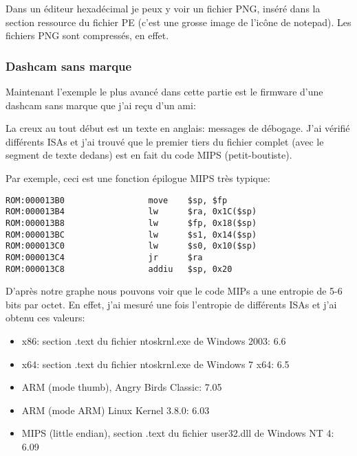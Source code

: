 

Dans un éditeur hexadécimal je peux y voir un fichier PNG, inséré dans la section
ressource du fichier PE (c'est une grosse image de l'icône de notepad).
Les fichiers PNG sont compressés, en effet.

\subsubsection{Dashcam sans marque}

Maintenant l'exemple le plus avancé dans cette partie est le firmware d'une dashcam
sans marque que j'ai reçu d'un ami:



La creux au tout début est un texte en anglais: messages de débogage.
J'ai vérifié différents \ac{ISA}s et j'ai trouvé que le premier tiers du fichier
complet (avec le segment de texte dedans) est en fait du code MIPS (petit-boutiste).

Par exemple, ceci est une fonction épilogue MIPS très typique:

\begin{lstlisting}[style=customasmMIPS]
ROM:000013B0                 move    $sp, $fp
ROM:000013B4                 lw      $ra, 0x1C($sp)
ROM:000013B8                 lw      $fp, 0x18($sp)
ROM:000013BC                 lw      $s1, 0x14($sp)
ROM:000013C0                 lw      $s0, 0x10($sp)
ROM:000013C4                 jr      $ra
ROM:000013C8                 addiu   $sp, 0x20
\end{lstlisting}

D'après notre graphe nous pouvons voir que le code MIPs a une entropie de 5-6 bits
par octet.
En effet, j'ai mesuré une fois l'entropie de différents \ac{ISA}s et j'ai obtenu
ces valeurs:

\begin{itemize}
\item x86: section .text du fichier ntoskrnl.exe de Windows 2003: 6.6
\item x64: section .text du fichier ntoskrnl.exe de Windows 7 x64: 6.5
\item ARM (mode thumb), Angry Birds Classic: 7.05
\item ARM (mode ARM) Linux Kernel 3.8.0: 6.03
\item MIPS (little endian), section .text du fichier user32.dll de Windows NT 4: 6.09
\end{itemize}

